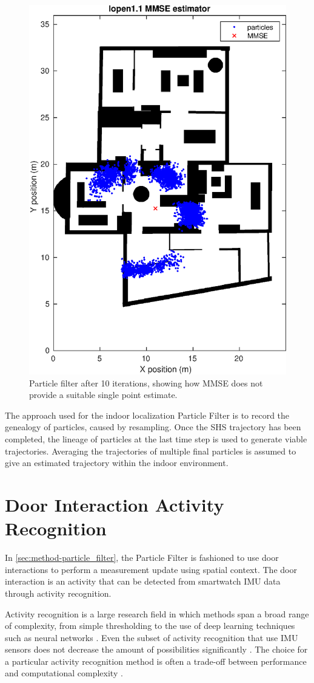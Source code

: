 \begin{figure}[H]
	\centering
	\includegraphics[width=0.35\linewidth]{images/20201108_1751_lopen1_1_MMSE_estimator}
	\caption{Particle filter after 10 iterations, showing how MMSE does not provide a suitable single point estimate.}
	\label{fig:lopen_11_mmse_estimator}
\end{figure}

The approach used for the indoor localization Particle Filter is to record the genealogy of particles, caused by resampling. Once the \ac{SHS} trajectory has been completed, the lineage of particles at the last time step is used to generate viable trajectories. Averaging the trajectories of multiple final particles is assumed to give an estimated trajectory within the indoor environment.
\newpage
\section{Door Interaction Activity Recognition}
\label{sec:method-AR}

In \cref{sec:method-particle_filter}, the Particle Filter is fashioned to use door interactions to perform a measurement update using spatial context. The door interaction is an activity that can be detected from smartwatch IMU data through activity recognition. \par 

Activity recognition is a large research field in which methods span a broad range of complexity, from simple thresholding to the use of deep learning techniques such as neural networks \cite{Lima2019}. Even the subset of activity recognition that use \ac{IMU} sensors does not decrease the amount of possibilities significantly \cite{cornacchia2016survey}. The choice for a particular activity recognition method is often a trade-off between performance and computational complexity \cite{Bulling2014}. \par 

